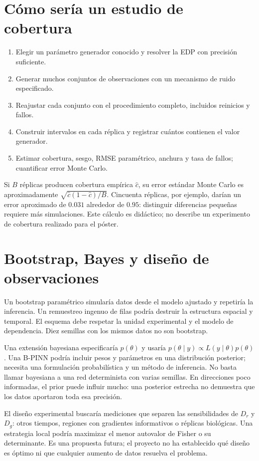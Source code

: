 \documentclass[11pt,a4paper]{report}
\begin{document}
\section{Cómo sería un estudio de cobertura}
\begin{enumerate}
\item Elegir un parámetro generador conocido y resolver la EDP con precisión suficiente.
\item Generar muchos conjuntos de observaciones con un mecanismo de ruido especificado.
\item Reajustar cada conjunto con el procedimiento completo, incluidos reinicios y fallos.
\item Construir intervalos en cada réplica y registrar cuántos contienen el valor generador.
\item Estimar cobertura, sesgo, RMSE paramétrico, anchura y tasa de fallos; cuantificar error Monte Carlo.
\end{enumerate}
Si $B$ réplicas producen cobertura empírica $\widehat c$, su error estándar Monte Carlo es aproximadamente $\sqrt{\widehat c(1-\widehat c)/B}$. Cincuenta réplicas, por ejemplo, darían un error aproximado de $0.031$ alrededor de $0.95$: distinguir diferencias pequeñas requiere más simulaciones. Este cálculo es didáctico; no describe un experimento de cobertura realizado para el póster.

\section{Bootstrap, Bayes y diseño de observaciones}
Un bootstrap paramétrico simularía datos desde el modelo ajustado y repetiría la inferencia. Un remuestreo ingenuo de filas podría destruir la estructura espacial y temporal. El esquema debe respetar la unidad experimental y el modelo de dependencia. Diez semillas con los mismos datos no son bootstrap.

Una extensión bayesiana especificaría $p(\theta)$ y usaría $p(\theta\mid y)\propto L(y\mid\theta)p(\theta)$. Una B-PINN podría incluir pesos y parámetros en una distribución posterior; necesita una formulación probabilística y un método de inferencia. No basta llamar bayesiana a una red determinista con varias semillas. En direcciones poco informadas, el prior puede influir mucho: una posterior estrecha no demuestra que los datos aportaron toda esa precisión.

El diseño experimental buscaría mediciones que separen las sensibilidades de $D_r$ y $D_g$: otros tiempos, regiones con gradientes informativos o réplicas biológicas. Una estrategia local podría maximizar el menor autovalor de Fisher o su determinante. Es una propuesta futura; el proyecto no ha establecido qué diseño es óptimo ni que cualquier aumento de datos resuelva el problema.
\end{document}
